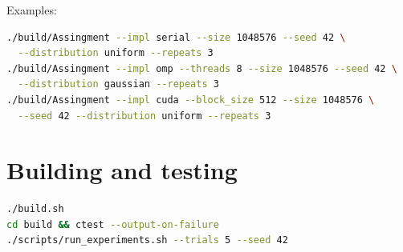 \documentclass[11pt,a4paper]{article}
\begin{document}
Examples:
\begin{lstlisting}[language=bash]
./build/Assingment --impl serial --size 1048576 --seed 42 \
  --distribution uniform --repeats 3
./build/Assingment --impl omp --threads 8 --size 1048576 --seed 42 \
  --distribution gaussian --repeats 3
./build/Assingment --impl cuda --block_size 512 --size 1048576 \
  --seed 42 --distribution uniform --repeats 3
\end{lstlisting}

\section{Building and testing}

\begin{lstlisting}[language=bash]
./build.sh
cd build && ctest --output-on-failure
./scripts/run_experiments.sh --trials 5 --seed 42
\end{lstlisting}
\end{document}
